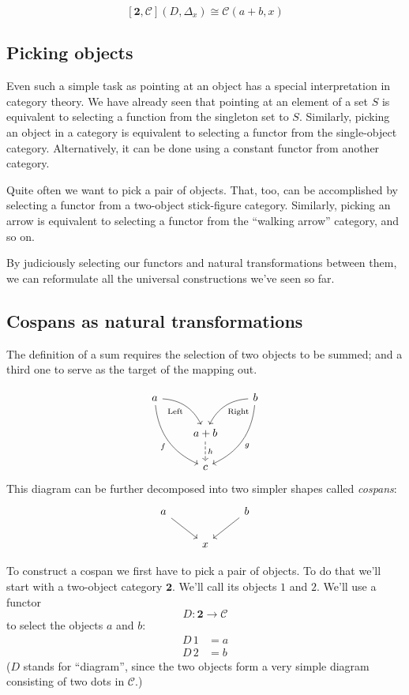 \documentclass[DaoFP]{subfiles}
\begin{document}
\[ [\mathbf{2}, \mathcal{C}](D, \Delta_x)  \cong \mathcal{C}(a + b, x) \]



\subsection{Picking objects}

Even such a simple task as pointing at an object has a special interpretation in category theory. We have already seen that pointing at an element of a set $S$ is equivalent to selecting a function from the singleton set to $S$. Similarly, picking an object in a category is equivalent to selecting a functor from the single-object category. Alternatively, it can be done using a constant functor from another category. 

Quite often we want to pick a pair of objects. That, too, can be accomplished by selecting a functor from a two-object stick-figure category. Similarly, picking an arrow is equivalent to selecting a functor from the ``walking arrow'' category, and so on.

By judiciously selecting our functors and natural transformations between them, we can reformulate all the universal constructions we've seen so far.

\subsection{Cospans as natural transformations}

The definition of a sum requires the selection of two objects to be summed; and a third one to serve as the target of the mapping out.

\[
 \begin{tikzcd}
 a
 \arrow[dr,  bend left, "\text{Left}"']
 \arrow[ddr, bend right, "f"']
 && b
 \arrow[dl, bend right, "\text{Right}"]
 \arrow[ddl, bend left, "g"]
 \\
&a + b
\arrow[d, dashed, "h"]
\\
& c
 \end{tikzcd}
\]
This diagram can be further decomposed into two simpler shapes called \emph{cospans}:
\[
 \begin{tikzcd}
 a
 \arrow[dr, ""']
 && b
 \arrow[dl, ""]
 \\
 & x
 \end{tikzcd}
\]

To construct a cospan we first have to pick a pair of objects. To do that we'll start with a two-object category $\mathbf{2}$. We'll call its objects $1$ and $2$. 
We'll use a functor 
\[ D \colon \mathbf{2} \to \mathcal{C}\]
to select the objects $a$ and $b$: 
\begin{align*}
D\, 1 &= a \\
D\, 2 &= b 
\end{align*}
($D$ stands for ``diagram'', since the two objects form a very simple diagram consisting of two dots in $\mathcal{C}$.)
\end{document}
